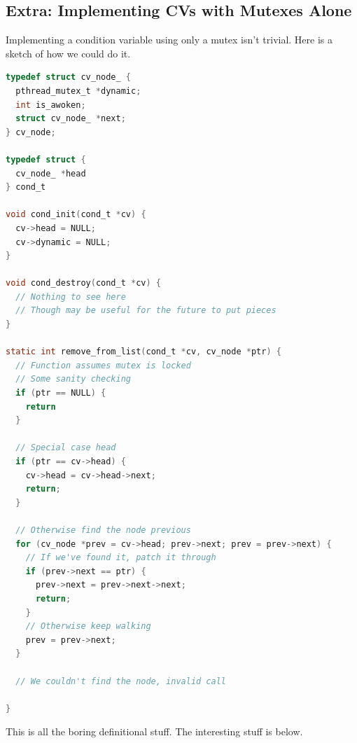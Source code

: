 \subsection{Extra: Implementing CVs with Mutexes Alone}

Implementing a condition variable using only a mutex isn't trivial.
Here is a sketch of how we could do it.

\begin{lstlisting}[language=C]
typedef struct cv_node_ {
  pthread_mutex_t *dynamic;
  int is_awoken;
  struct cv_node_ *next;
} cv_node;

typedef struct {
  cv_node_ *head
} cond_t

void cond_init(cond_t *cv) {
  cv->head = NULL;
  cv->dynamic = NULL;
}

void cond_destroy(cond_t *cv) {
  // Nothing to see here
  // Though may be useful for the future to put pieces
}

static int remove_from_list(cond_t *cv, cv_node *ptr) {
  // Function assumes mutex is locked
  // Some sanity checking
  if (ptr == NULL) {
    return
  }

  // Special case head
  if (ptr == cv->head) {
    cv->head = cv->head->next;
    return;
  }

  // Otherwise find the node previous
  for (cv_node *prev = cv->head; prev->next; prev = prev->next) {
    // If we've found it, patch it through
    if (prev->next == ptr) {
      prev->next = prev->next->next;
      return;
    }
    // Otherwise keep walking
    prev = prev->next;
  }

  // We couldn't find the node, invalid call

}
\end{lstlisting}

This is all the boring definitional stuff.
The interesting stuff is below.


